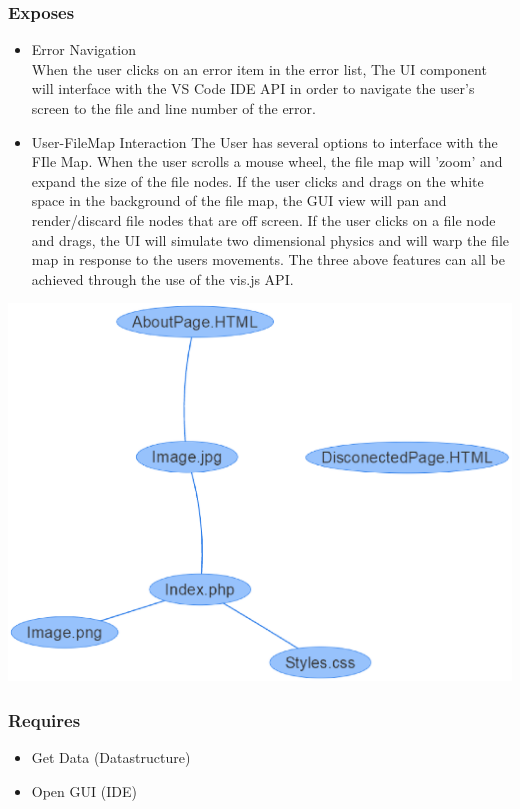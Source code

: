 \documentclass[letterpaper,10pt,titlepage,draftclsnofoot,onecolumn,onesided] {IEEEtran}
\begin{document}
\begin{itemize}
		\subsubsection{Exposes}
		\begin{itemize}
			\item Error Navigation 
			\\
			When the user clicks on an error item in the error list, The UI component will interface with the VS Code IDE API in order to navigate the user's screen to the file and line number of the error.
			\item User-FileMap Interaction
			The User has several options to interface with the FIle Map. 
			When the user scrolls a mouse wheel, the file map will 'zoom' and expand the size of the file nodes.
			If the user clicks and drags on the white space in the background of the file map, the GUI view will pan and render/discard file nodes that are off screen.
			If the user clicks on a file node and drags, the UI will simulate two dimensional physics and will warp the file map in response to the users movements.
			The three above features can all be achieved through the use of the vis.js API.
		\end{itemize}
		\includegraphics{UIMockupEPS}
		\subsubsection{Requires}
		\begin{itemize}
			\item Get Data (Datastructure)
			\item Open GUI (IDE)
		\end{itemize}
		

\end{itemize}
\end{document}
